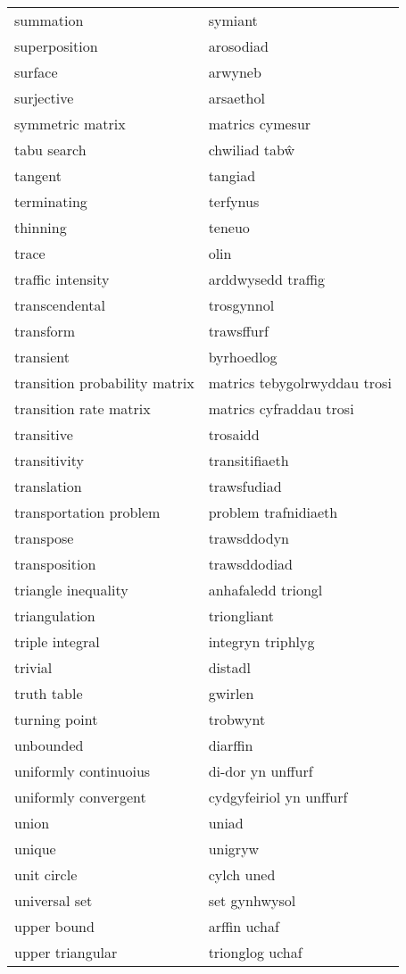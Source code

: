 \begin{supertabular}{p{0.22\textwidth}p{0.22\textwidth}}
summation & symiant \\
superposition & arosodiad \\
surface & arwyneb \\
surjective & arsaethol \\
symmetric matrix & matrics cymesur \\
tabu search & chwiliad tabŵ \\
tangent & tangiad \\
terminating & terfynus \\
thinning & teneuo \\
trace & olin \\
traffic intensity & arddwysedd traffig \\
transcendental & trosgynnol \\
transform & trawsffurf \\
transient & byrhoedlog \\
transition probability matrix & matrics tebygolrwyddau trosi \\
transition rate matrix & matrics cyfraddau trosi \\
transitive & trosaidd \\
transitivity & transitifiaeth \\
translation & trawsfudiad \\
transportation problem & problem trafnidiaeth \\
transpose & trawsddodyn \\
transposition & trawsddodiad \\
triangle inequality & anhafaledd triongl \\
triangulation & triongliant \\
triple integral & integryn triphlyg \\
trivial & distadl \\
truth table & gwirlen \\
turning point & trobwynt \\
unbounded & diarffin \\
uniformly continuoius & di-dor yn unffurf \\
uniformly convergent & cydgyfeiriol yn unffurf \\
union & uniad \\
unique & unigryw \\
unit circle & cylch uned \\
universal set & set gynhwysol \\
upper bound & arffin uchaf \\
upper triangular & trionglog uchaf \\

\end{supertabular}
